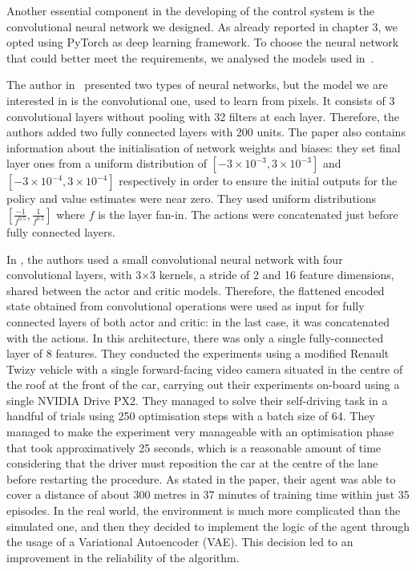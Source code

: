 Another essential component in the developing of the control system is the convolutional neural network we designed.
As already reported in chapter 3, we opted using PyTorch as deep learning framework.
To choose the neural network that could better meet the requirements, we analysed the models used in~\cite{lillicrap2015continuous,kendall2018learning,haarnoja2018soft, haarnoja2018alg}.

The author in~\cite{lillicrap2015continuous} presented two types of neural networks, but the model we are interested in is the convolutional one, used to learn from pixels.
It consists of 3 convolutional layers without pooling with 32 filters at each layer.
Therefore, the authors added two fully connected layers with 200 units.
The paper also contains information about the initialisation of network weights and biases: they set final layer ones from a uniform distribution of $[-3\times 10^{-3},3\times 10^{-3}]$ and $[-3\times 10^{-4},3\times 10^{-4}]$ respectively in order to ensure the initial outputs for the policy and value estimates were near zero.
They used uniform distributions $[\frac{-1}{f^{0.5}}, \frac{1}{f^{0.5}}]$ where $f$ is the layer fan-in.
The actions were concatenated just before fully connected layers.

In \cite{kendall2018learning}, the authors used a small convolutional neural network with four convolutional layers, with 3$\times$3 kernels, a stride of 2 and 16 feature dimensions, shared between the actor and critic models.
Therefore, the flattened encoded state obtained from convolutional operations were used as input for fully connected layers of both actor and critic: in the last case, it was concatenated with the actions.
In this architecture, there was only a single fully-connected layer of 8 features.
They conducted the experiments using a modified Renault Twizy vehicle with a single forward-facing video camera situated in the centre of the roof at the front of the car, carrying out their experiments on-board using a single NVIDIA Drive PX2.
They managed to solve their self-driving task in a handful of trials using 250 optimisation steps with a batch size of 64.
They managed to make the experiment very manageable with an optimisation phase that took approximatively 25 seconds, which is a reasonable amount of time considering that the driver must reposition the car at the centre of the lane before restarting the procedure.
As stated in the paper, their agent was able to cover a distance of about 300 metres in 37 minutes of training time within just 35 episodes.
In the real world, the environment is much more complicated than the simulated one, and then they decided to implement the logic of the agent through the usage of a Variational Autoencoder (VAE).
This decision led to an improvement in the reliability of the algorithm.

